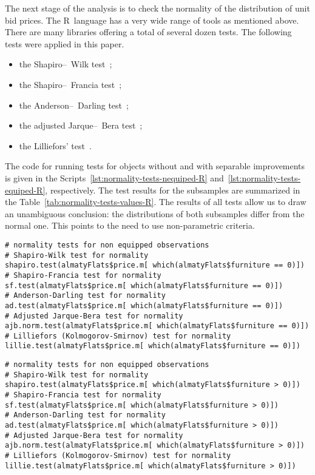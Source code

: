 \documentclass[]{scrreprt}
\begin{document}
The next stage of the analysis is to check the normality of the distribution of unit bid prices. The R~language has a very wide range of tools as mentioned above. There are many libraries offering a total of several dozen tests. The following tests were applied in this paper.
\begin{itemize}
	\item the Shapiro--~Wilk test~\cite{Shapiro-Wilk-test};
	\item the Shapiro--~Francia test~\cite{Shapiro-Francia-test};
	\item the Anderson--~Darling test~\cite{Anderson-Darling-test};
	\item the adjusted Jarque--~Bera test~\cite{Jarque-Bera-test};
	\item the Lilliefors' test~\cite{Liliefors-normality-test}.
\end{itemize}
The code for running tests for objects without and with separable improvements is given in the Scripts~\ref{lst:normality-tests-nequiped-R} and~\ref{lst:normality-tests-equiped-R}, respectively. The test results for the subsamples are summarized in the Table~\ref{tab:normality-tests-values-R}. The results of all tests allow us to draw an unambiguous conclusion: the distributions of both subsamples differ from the normal one. This points to the need to use non-parametric criteria.
%
\begin{lstlisting}[float=htp, caption = Performing normality tests for observations without separable improvements and chattels, firstnumber=1, label= lst:normality-tests-nequiped-R]
# normality tests for non equipped observations
# Shapiro-Wilk test for normality
shapiro.test(almatyFlats$price.m[ which(almatyFlats$furniture == 0)])
# Shapiro-Francia test for normality
sf.test(almatyFlats$price.m[ which(almatyFlats$furniture == 0)])
# Anderson-Darling test for normality
ad.test(almatyFlats$price.m[ which(almatyFlats$furniture == 0)])
# Adjusted Jarque-Bera test for normality
ajb.norm.test(almatyFlats$price.m[ which(almatyFlats$furniture == 0)])
# Lilliefors (Kolmogorov-Smirnov) test for normality
lillie.test(almatyFlats$price.m[ which(almatyFlats$furniture == 0)])
\end{lstlisting}
%
\begin{lstlisting}[float=htp, caption = Performing normality tests for observations with separable improvements and chattels, firstnumber=1, label= lst:normality-tests-equiped-R]
# normality tests for non equipped observations
# Shapiro-Wilk test for normality
shapiro.test(almatyFlats$price.m[ which(almatyFlats$furniture > 0)])
# Shapiro-Francia test for normality
sf.test(almatyFlats$price.m[ which(almatyFlats$furniture > 0)])
# Anderson-Darling test for normality
ad.test(almatyFlats$price.m[ which(almatyFlats$furniture > 0)])
# Adjusted Jarque-Bera test for normality
ajb.norm.test(almatyFlats$price.m[ which(almatyFlats$furniture > 0)])
# Lilliefors (Kolmogorov-Smirnov) test for normality
lillie.test(almatyFlats$price.m[ which(almatyFlats$furniture > 0)])
\end{lstlisting}
%
\end{document}
